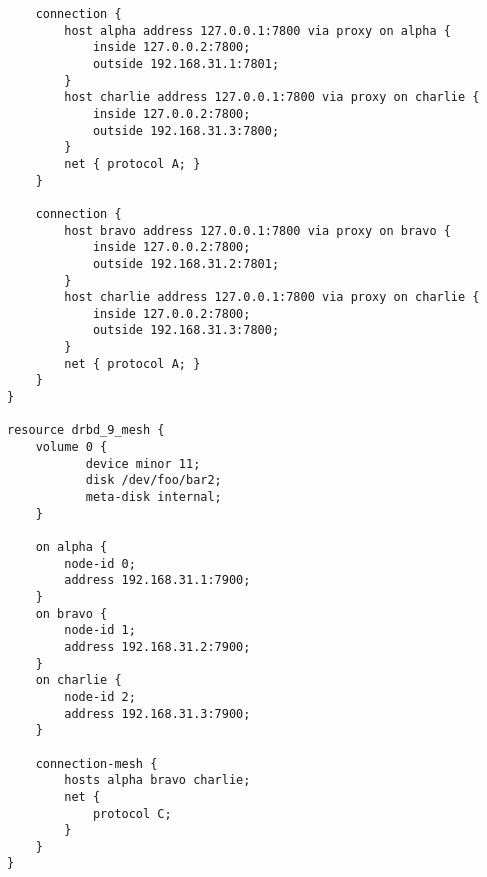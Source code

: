 \begin{lstlisting}
	connection {
		host alpha address 127.0.0.1:7800 via proxy on alpha {
			inside 127.0.0.2:7800;
			outside 192.168.31.1:7801;
		}
		host charlie address 127.0.0.1:7800 via proxy on charlie {
			inside 127.0.0.2:7800;
			outside 192.168.31.3:7800;
		}
		net { protocol A; }
	}

	connection {
		host bravo address 127.0.0.1:7800 via proxy on bravo {
			inside 127.0.0.2:7800;
			outside 192.168.31.2:7801;
		}
		host charlie address 127.0.0.1:7800 via proxy on charlie {
			inside 127.0.0.2:7800;
			outside 192.168.31.3:7800;
		}
		net { protocol A; }
	}
}

resource drbd_9_mesh {
	volume 0 {
	       device minor 11;
	       disk /dev/foo/bar2;
	       meta-disk internal;
	}

	on alpha {
		node-id 0;
		address 192.168.31.1:7900;
	}
	on bravo {
		node-id 1;
		address 192.168.31.2:7900;
	}
	on charlie {
		node-id 2;
		address 192.168.31.3:7900;
	}

	connection-mesh {
		hosts alpha bravo charlie;
		net {
			protocol C;
		}
	}
}
\end{lstlisting}
